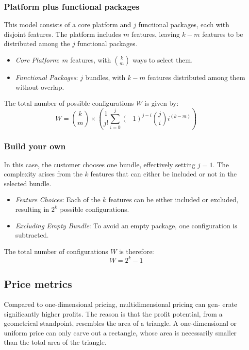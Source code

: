 \documentclass{article}
\begin{document}
\subsubsection{Platform plus functional packages}

This model consists of a core platform and \( j \) functional packages, each with disjoint features. The platform includes \( m \) features, leaving \( k-m \) features to be distributed among the \( j \) functional packages.

\begin{itemize}
    \item \textit{Core Platform}: \( m \) features, with \( \binom{k}{m} \) ways to select them.
    \item \textit{Functional Packages}: \( j \) bundles, with \( k-m \) features distributed among them without overlap.
\end{itemize}

The total number of possible configurations \( W \) is given by:
\[
W = \binom{k}{m} \times \left( \frac{1}{j!} \sum_{i=0}^{j} (-1)^{j-i} \binom{j}{i} i^{(k-m)} \right)
\]


\subsubsection{Build your own}

In this case, the customer chooses one bundle, effectively setting \( j = 1 \). The complexity arises from the \( k \) features that can either be included or not in the selected bundle.

\begin{itemize}
    \item \textit{Feature Choices}: Each of the \( k \) features can be either included or excluded, resulting in \( 2^k \) possible configurations.
    \item \textit{Excluding Empty Bundle}: To avoid an empty package, one configuration is subtracted.
\end{itemize}

The total number of configurations \( W \) is therefore:
\[
W = 2^k - 1
\]

\subsection{Price metrics}

Compared to one-dimensional pricing, multidimensional pricing can gen- erate significantly higher profits. The reason is that the profit potential, from a geometrical standpoint, resembles the area of a triangle. A one-dimensional or uniform price can only carve out a rectangle, whose area is necessarily smaller than the total area of the triangle.
\end{document}
